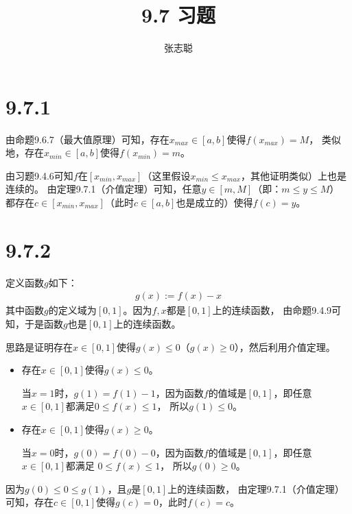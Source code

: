 \documentclass{article}
\begin{document}
\title{9.7 习题}
\author{张志聪}
\maketitle

\section*{9.7.1}

由命题9.6.7（最大值原理）可知，存在$x_{max} \in [a, b]$使得$f(x_{max}) = M$，
类似地，存在$x_{min} \in [a, b]$使得$f(x_{min}) = m$。

由习题9.4.6可知$f$在$[x_{min}, x_{max}]$（这里假设$x_{min} \leq x_{max}$，其他证明类似）上也是连续的。
由定理9.7.1（介值定理）可知，任意$y \in [m, M]$（即：$m \leq y \leq M$）
都存在$c \in [x_{min}, x_{max}]$（此时$c \in [a, b]$也是成立的）使得$f(c) = y$。

\section*{9.7.2}

定义函数$g$如下：
\begin{align*}
  g(x) := f(x) - x
\end{align*}
其中函数$g$的定义域为$[0, 1]$。因为$f,x$都是$[0, 1]$上的连续函数，
由命题9.4.9可知，于是函数$g$也是$[0, 1]$上的连续函数。

思路是证明存在$x \in [0, 1]$使得$g(x) \leq 0$（$g(x) \geq 0$），然后利用介值定理。

\begin{itemize}
  \item 存在$x \in [0, 1]$使得$g(x) \leq 0$。

        当$x = 1$时，$g(1) = f(1) - 1$，因为函数$f$的值域是$[0, 1]$，即任意$x \in [0, 1]$都满足$0 \leq f(x) \leq 1$，
        所以$g(1) \leq 0$。

  \item 存在$x \in [0, 1]$使得$g(x) \geq 0$。

        当$x = 0$时，$g(0) = f(0) - 0$，因为函数$f$的值域是$[0, 1]$，即任意$x \in [0, 1]$都满足 $ 0 \leq f(x) \leq 1$，
        所以$g(0) \geq 0$。
\end{itemize}

因为$g(0) \leq 0 \leq g(1)$，且$g$是$[0, 1]$上的连续函数，
由定理9.7.1（介值定理）可知，存在$c \in [0, 1]$使得$g(c) = 0$，此时$f(c) = c$。
\end{document}
